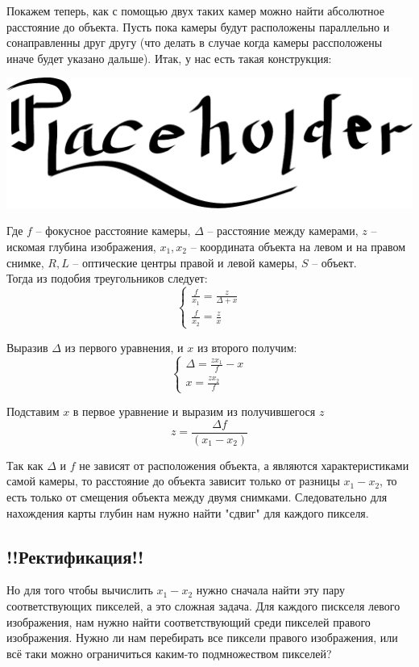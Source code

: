 Покажем теперь, как с помощью двух таких камер можно найти абсолютное расстояние до объекта. Пусть пока камеры будут расположены параллельно и сонаправленны друг другу (что делать в случае когда камеры рассположены иначе будет указано дальше).
Итак, у нас есть такая конструкция:
	
		\includegraphics[scale = 0.75]{placeholder}
	
	Где $f$ -- фокусное расстояние камеры, $\Delta$ -- расстояние между камерами, $z$ -- искомая глубина изображения, $x_1, x_2$ -- координата объекта на левом и на правом снимке, $R, L$ -- оптические центры правой и левой камеры, $S$ -- объект.\\
	
	Тогда из подобия треугольников следует:\\
	$$\begin{cases} \frac{f}{x_1} = \frac{z}{\Delta + x} \\ \frac{f}{x_2} = \frac{z}{x} \end{cases}$$
	
	Выразив $\Delta$ из первого уравнения, и $x$ из второго получим:\\
	$$\begin{cases} \Delta = \frac{z x_1}{f} - x \\ x = \frac{zx_2}{f} \end{cases}$$
	
	Подставим $x$ в первое уравнение и выразим из получившегося $z$\\
	$$ z = \frac{\Delta f}{(x_1 - x_2)}$$
	
	Так как $\Delta$ и $f$ не зависят от расположения объекта, а являются характеристиками самой камеры, то расстояние до объекта зависит только от разницы $x_1 - x_2$, то есть только от смещения объекта между двумя снимками. Следовательно для нахождения карты глубин нам нужно найти "сдвиг" для каждого пикселя.\\
	
\subsection{!!Ректификация!!}	
	Но для того чтобы вычислить $x_1 - x_2$ нужно сначала найти эту пару соответствующих пикселей, а это сложная задача. Для каждого пискселя левого изображения, нам нужно найти соответствующий среди пикселей правого изображения. Нужно ли нам перебирать все пиксели правого изображения, или всё таки можно ограничиться каким-то подмножеством пикселей?\\
	
